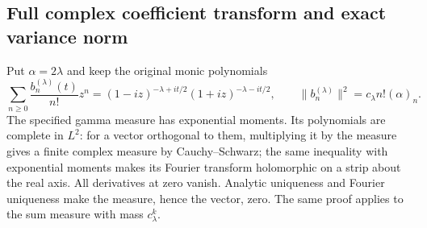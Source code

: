 \subsection{Full complex coefficient transform and exact variance norm}
Put $\alpha=2\lambda$ and keep the original monic polynomials
\begin{equation}
 \sum_{n\geq0}\frac{b_n^{(\lambda)}(t)}{n!}z^n
 =(1-iz)^{-\lambda+it/2}(1+iz)^{-\lambda-it/2},\qquad
 \|b_n^{(\lambda)}\|^2=c_\lambda n!(\alpha)_n.
 \tag{GP.14}
\end{equation}
The specified gamma measure has exponential moments. Its polynomials
are complete in $L^2$: for a vector orthogonal to them, multiplying
it by the measure gives a finite complex measure by Cauchy--Schwarz;
the same inequality with exponential moments makes its Fourier
transform holomorphic on a strip about the real axis. All derivatives
at zero vanish. Analytic uniqueness and Fourier uniqueness make the
measure, hence the vector, zero. The same proof applies to the sum
measure with mass $c_\lambda^k$.

